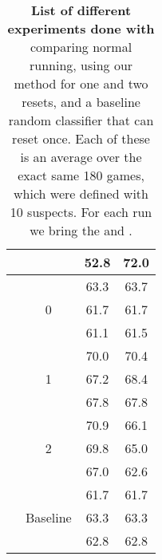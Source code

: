 \begin{table}
\begin{tabular}{|c | c c c|}
 & & 52.8 & 72.0 \\
\midrule
\multirow{12}{*}{\gpt{}} & \multirow{3}{*}{0} & 63.3 & 63.7 \\
 & & 61.7 & 61.7 \\
 & & 61.1 & 61.5 \\
\cline{2-4}
 & \multirow{3}{*}{1} & 70.0 & 70.4 \\
 & & 67.2 & 68.4 \\
 & & 67.8 & 67.8 \\
\cline{2-4}
 & \multirow{3}{*}{2} & 70.9 & 66.1 \\
 & & 69.8 & 65.0 \\
 & & 67.0 & 62.6 \\
\cline{2-4}
 & \multirow{3}{*}{Baseline} & 61.7 & 61.7 \\
 & & 63.3 & 63.3 \\
 & & 62.8 & 62.8 \\
    
    \bottomrule
  \end{tabular}

  \caption{\textbf{List of different experiments done with \ourenvasym{}} comparing normal running, using our method for one and two resets, and a baseline random classifier that can reset once. Each of these is an average over the exact same 180 games, which were defined with 10 suspects. For each run we bring the \success{} and \precision{}.}
  \label{tab:asymmresults}
\end{table}


